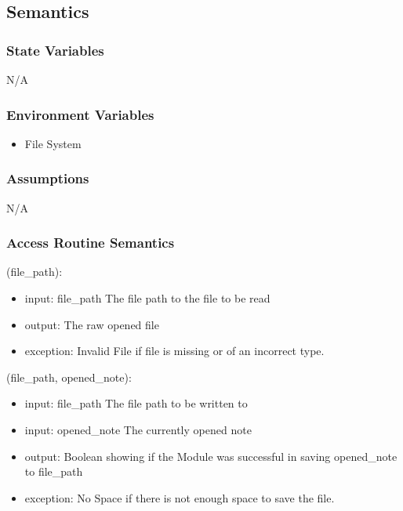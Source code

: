 \documentclass[12pt, titlepage]{article}
\begin{document}
\subsection{Semantics}

\subsubsection{State Variables}

N/A

\subsubsection{Environment Variables}

\begin{itemize}
\item File System
\end{itemize}
\subsubsection{Assumptions}
N/A

\subsubsection{Access Routine Semantics}

(file\_path):
\begin{itemize}
\item input: file\_path The file path to the file to be read
\item output: The raw opened file
\item exception: Invalid File if file is missing or of an incorrect type.
\end{itemize}
(file\_path, opened\_note):

\begin{itemize}
\item input: file\_path The file path to be written to 
\item input: opened\_note The currently opened note
\item output: Boolean showing if the Module was successful in saving opened\_note to file\_path
\item exception: No Space if there is not enough space to save the file.

\end{itemize}
%
\end{document}
